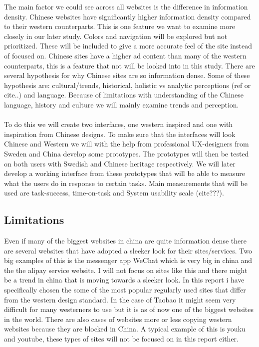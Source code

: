  The main factor we could see across all websites is the difference in information density. Chinese websites have significantly higher information density compared to their western counterparts. This is one feature we want to examine more closely in our later study. Colors and navigation will be explored but not prioritized. These will be included to give a more accurate feel of the site instead of focused on. Chinese sites have a higher ad content than many of the western counterparts, this is a feature that not will be looked into in this study.   There are several hypothesis for why Chinese sites are so information dense. Some of these hypothesis are: cultural/trends, historical, holistic vs analytic perceptions (ref or cite..) and language. Because of limitations with understanding of the Chinese language, history and culture we will mainly examine trends and perception.
 \\\\
  To do this we will create two interfaces, one western inspired and one with inspiration from Chinese designs. To make sure that the interfaces will look Chinese and Western we will with the help from professional UX-designers from Sweden and China develop some prototypes. The prototypes will then be tested on both users with Swedish and Chinese heritage respectively. We will later develop a working interface from these prototypes that will be able to measure what the users do in response to certain tasks. Main measurements that will be used are task-success, time-on-task and System usability scale (cite???). 
 
 \subsection{Limitations}
 Even if many of the biggest websites in china are quite information dense there are several websites that have adopted a sleeker look for their sites/services. Two big examples of this is the messenger app WeChat which is very big in china and the the alipay service website. I will not focus on sites like this and there might be a trend in china that is moving towards a sleeker look. In this report i have specifically chosen the some of the most popular regularly used sites that differ from the western design standard. In the case of Taobao it might seem very difficult for many westerners to use but it is as of now one of the biggest websites in the world. There are also cases of websites more or less copying western websites because they are blocked in China. A typical example of this is youku and youtube, these types of sites will not be focused on in this report either.
